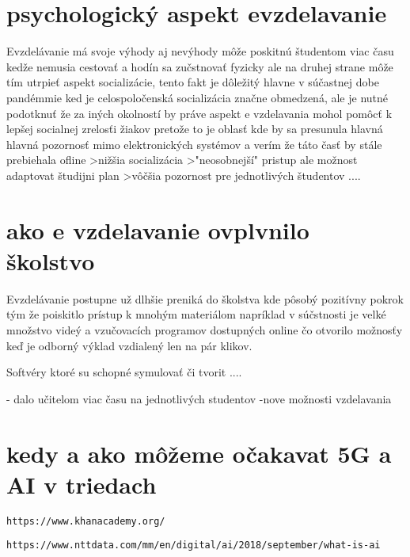 \documentclass[10pt,oneside,slovak,a4paper]{article}
\begin{document}
\section{psychologický aspekt evzdelavanie }
Evzdelávanie má svoje výhody aj nevýhody môže poskitnú študentom viac času kedže nemusia cestovať a hodín sa zučstnovať fyzicky ale na druhej strane môže tím utrpieť aspekt socializácie, tento fakt je dôležitý hlavne v súčastnej dobe pandémmie ked je celospoločenská socializácia značne obmedzená, ale je nutné podotknuť že za iných okolností by práve aspekt e vzdelavania mohol pomôcť k lepšej socialnej zrelosťi žiakov pretože to je oblasť kde by sa presunula hlavná hlavná pozornosť mimo elektronických systémov a verím že táto časť by stále prebiehala ofline 
>nižšia socializácia 
>"neosobnejší" pristup ale možnost adaptovat študijni plan 
>vôčšia pozornost pre jednotlivých študentov ....

\section{ako e vzdelavanie ovplvnilo školstvo}
Evzdelávanie postupne už dlhšie preniká do školstva kde pôsobý pozitívny pokrok tým že poiskitlo prístup k mnohým materiálom napríklad v súčstnosti je velké množstvo videý a vzučovacích programov dostupných online čo otvorilo možnosťy keď je odborný výklad vzdialený len na pár klikov. 

Softvéry ktoré su schopné symulovať či tvorit ....\cite{10.1145/3399971.3399984}


- dalo učitelom viac času na jednotlivých studentov 
-nove možnosti vzdelavania 

\section{kedy a ako môžeme očakavat 5G a AI v triedach}




\begin{thebibliography}{9}
	
	\texttt{https://www.khanacademy.org/}
	
	\texttt{https://www.nttdata.com/mm/en/digital/ai/2018/september/what-is-ai}
	\date{22.11.2020}
	
	
\end{thebibliography}
\end{document}
